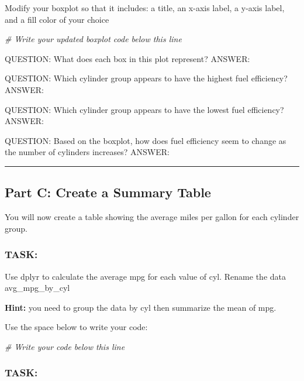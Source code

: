 \documentclass[
]{article}
\newenvironment{Shaded}{\begin{snugshade}}{\end{snugshade}}
\newcommand{\CommentTok}[1]{\textcolor[rgb]{0.56,0.35,0.01}{\textit{#1}}}
\begin{document}
Modify your boxplot so that it includes: a title, an x-axis label, a
y-axis label, and a fill color of your choice

\begin{Shaded}
\begin{Highlighting}[]
\CommentTok{\# Write your updated boxplot code below this line}
\end{Highlighting}
\end{Shaded}

QUESTION: What does each box in this plot represent? ANSWER:

QUESTION: Which cylinder group appears to have the highest fuel
efficiency? ANSWER:

QUESTION: Which cylinder group appears to have the lowest fuel
efficiency? ANSWER:

QUESTION: Based on the boxplot, how does fuel efficiency seem to change
as the number of cylinders increases? ANSWER:

\begin{center}\rule{0.5\linewidth}{0.5pt}\end{center}

\subsection{Part C: Create a Summary
Table}\label{part-c-create-a-summary-table}

You will now create a table showing the average miles per gallon for
each cylinder group.

\subsubsection{TASK:}\label{task-4}

Use dplyr to calculate the average mpg for each value of cyl. Rename the
data avg\_mpg\_by\_cyl

\textbf{Hint:} you need to group the data by cyl then summarize the mean
of mpg.

Use the space below to write your code:

\begin{Shaded}
\begin{Highlighting}[]
\CommentTok{\# Write your code below this line}
\end{Highlighting}
\end{Shaded}

\subsubsection{TASK:}\label{task-5}
\end{document}
